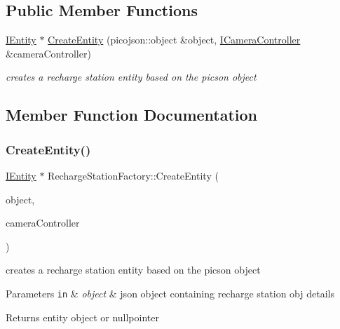 \subsection*{Public Member Functions}
\begin{DoxyCompactItemize}
\item 
\hyperlink{classIEntity}{I\+Entity} $\ast$ \hyperlink{classRechargeStationFactory_a5a870c5d317e1ec6932dc2a03d571474}{Create\+Entity} (picojson\+::object \&object, \hyperlink{classICameraController}{I\+Camera\+Controller} \&camera\+Controller)
\begin{DoxyCompactList}\small\item\em creates a recharge station entity based on the picson object \end{DoxyCompactList}\end{DoxyCompactItemize}


\subsection{Member Function Documentation}
\mbox{\label{classRechargeStationFactory_a5a870c5d317e1ec6932dc2a03d571474}} 
\subsubsection{\texorpdfstring{Create\+Entity()}{CreateEntity()}}
{\footnotesize\ttfamily \hyperlink{classIEntity}{I\+Entity} $\ast$ Recharge\+Station\+Factory\+::\+Create\+Entity (\begin{DoxyParamCaption}\item[{picojson\+::object \&}]{object,  }\item[{\hyperlink{classICameraController}{I\+Camera\+Controller} \&}]{camera\+Controller }\end{DoxyParamCaption})\hspace{0.3cm}{\ttfamily [virtual]}}



creates a recharge station entity based on the picson object 


\begin{DoxyParams}[1]{Parameters}
\mbox{\tt in}  & {\em object} & json object containing recharge station obj details\\
\hline
\end{DoxyParams}
\begin{DoxyReturn}{Returns}
entity object or nullpointer 
\end{DoxyReturn}



